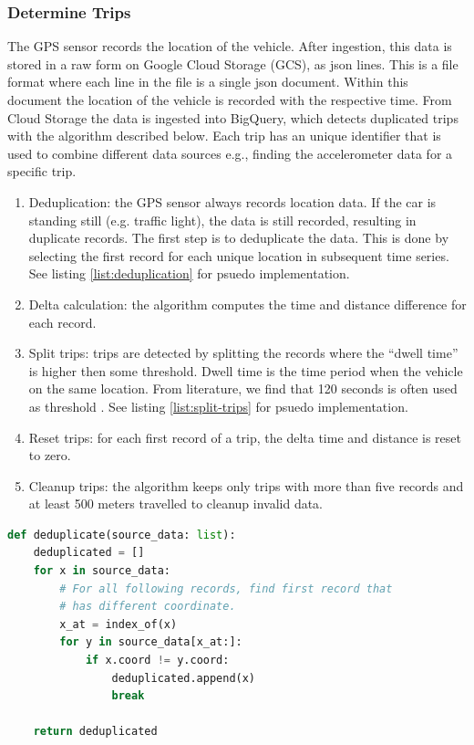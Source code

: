 \subsubsection{Determine Trips}
The GPS sensor records the location of the vehicle. After ingestion, this data is stored in a raw form on Google Cloud Storage (GCS), as json lines. This is a file format where each line in the file is a single json document. Within this document the location of the vehicle is recorded with the respective time. From Cloud Storage the data is ingested into BigQuery, which detects duplicated trips with the algorithm described below. Each trip has an unique identifier that is used to combine different data sources e.g., finding the accelerometer data for a specific trip.

\begin{enumerate}
\item Deduplication: the GPS sensor always records location data. If the car is standing still (e.g. traffic light), the data is still recorded, resulting in duplicate records. The first step is to deduplicate the data. This is done by selecting the first record for each unique location in subsequent time series. See listing \ref{list:deduplication} for psuedo implementation.
\item Delta calculation: the algorithm computes the time and distance difference for each record.
\item Split trips: trips are detected by splitting the records where the ``dwell time'' is higher then some threshold. Dwell time is the time period when the vehicle on the same location. From literature, we find that 120 seconds is often used as threshold \cite{Wolf2001}. See listing \ref{list:split-trips} for psuedo implementation.
\item Reset trips: for each first record of a trip, the delta time and distance is reset to zero.
\item Cleanup trips: the algorithm keeps only trips with more than five records and at least 500 meters travelled to cleanup invalid data.
\end{enumerate}

\begin{lstlisting}[language=Python, caption={Psuedo implementation of deduplicating GPS coordinates.}, label={list:deduplication}]
def deduplicate(source_data: list):
    deduplicated = []
    for x in source_data:
        # For all following records, find first record that
        # has different coordinate.
        x_at = index_of(x)
        for y in source_data[x_at:]:
            if x.coord != y.coord:
                deduplicated.append(x)
                break
                
    return deduplicated
\end{lstlisting}
    
